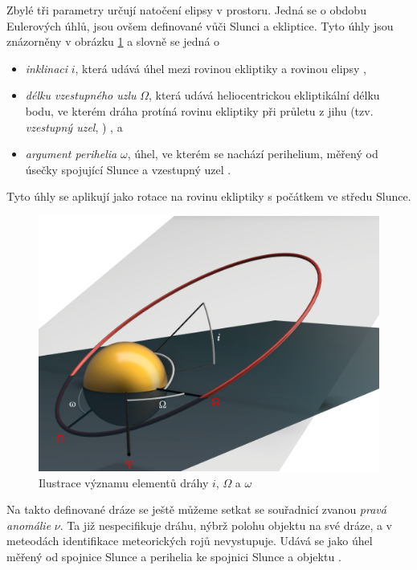 
\smallskip

Zbylé tři parametry určují natočení elipsy v prostoru. Jedná se o obdobu Eulerových úhlů, jsou ovšem definované vůči Slunci a ekliptice. Tyto úhly jsou znázorněny v obrázku \ref{img:elementy} a slovně se jedná o
\begin{itemize}
    \item \textit{inklinaci} $i$, která udává úhel mezi rovinou ekliptiky a rovinou elipsy \cite{astro},
    \item \textit{délku vzestupného uzlu} $\Omega$, která udává heliocentrickou ekliptikální délku bodu, ve kterém dráha protíná rovinu ekliptiky při průletu z jihu (tzv. \textit{vzestupný uzel}, \NorthNode) \cite{astro}, a
    \item \textit{argument perihelia} $\omega$, úhel, ve kterém se nachází perihelium, měřený od úsečky spojující Slunce a vzestupný uzel \cite{astro}.
\end{itemize}
Tyto úhly se aplikují jako rotace na rovinu ekliptiky s počátkem ve středu Slunce.

\begin{figure}[ht]
    \centering
    \includegraphics[width=0.8\linewidth]{img/orbit-elements-marked.png}
    \caption{Ilustrace významu elementů dráhy $i$, $\Omega$ a $\omega$ \cite{astro}}
    \label{img:elementy}
\end{figure}

\medskip

Na takto definované dráze se ještě můžeme setkat se souřadnicí zvanou \textit{pravá anomálie} $\nu$. Ta již nespecifikuje dráhu, nýbrž polohu objektu na své dráze, a v meteodách identifikace meteorických rojů nevystupuje. Udává se jako úhel měřený od spojnice Slunce a perihelia ke spojnici Slunce a objektu \cite{astro}.

